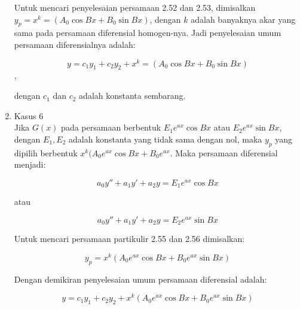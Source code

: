 \begin{enumerate}[1.]
	Untuk mencari penyelesaian persamaan 2.52 dan 2.53, dimisalkan \begin{math} y_p = x^{k} = (A_0 \cos Bx + B_0 \sin Bx) \end{math}, dengan \begin{math} k \end{math} adalah banyaknya akar yang sama pada persamaan diferensial homogen-nya. Jadi penyelesaian umum persamaan diferensialnya adalah:

	\begin{equation} y = c_1 y_1 + c_2 y_2 + x^{k} = (A_0 \cos Bx + B_0 \sin Bx) \end{equation},

	dengan \begin{math} c_1 \end{math} dan \begin{math} c_2 \end{math} adalah konstanta sembarang.

	\item Kasus 6 \\

	Jika \begin{math} G(x) \end{math} pada persamaan berbentuk \begin{math} E_1 e^{ax} \cos Bx \end{math} atau \begin{math} E_2 e^{ax} \sin Bx \end{math}, dengan \begin{math} E_1, E_2 \end{math} adalah konstanta yang tidak sama dengan nol, maka \begin{math} y_p \end{math} yang dipilih berbentuk \begin{math} x^{k} (A_0 e^{ax} \cos Bx + B_0 e^{ax} \end{math}. Maka persamaan diferensial menjadi:

	\begin{equation} a_0 y'' + a_1 y' + a_2 y = E_1 e^{ax} \cos Bx \end{equation}

	atau

	\begin{equation} a_0 y'' + a_1 y' + a_2 y = E_2 e^{ax} \sin Bx \end{equation}

	Untuk mencari persamaan partikulir 2.55 dan 2.56 dimisalkan:

	\begin{displaymath} y_p = x^{k} (A_0 e^{ax} \cos Bx + B_0 e^{ax} \sin Bx) \end{displaymath}

	Dengan demikiran penyelesaian umum persamaan diferensial adalah:

	\begin{equation} y = c_1 y_1 + c_2 y_2 +  x^{k} (A_0 e^{ax} \cos Bx + B_0 e^{ax} \sin Bx)  \end{equation}

	\end{enumerate}

